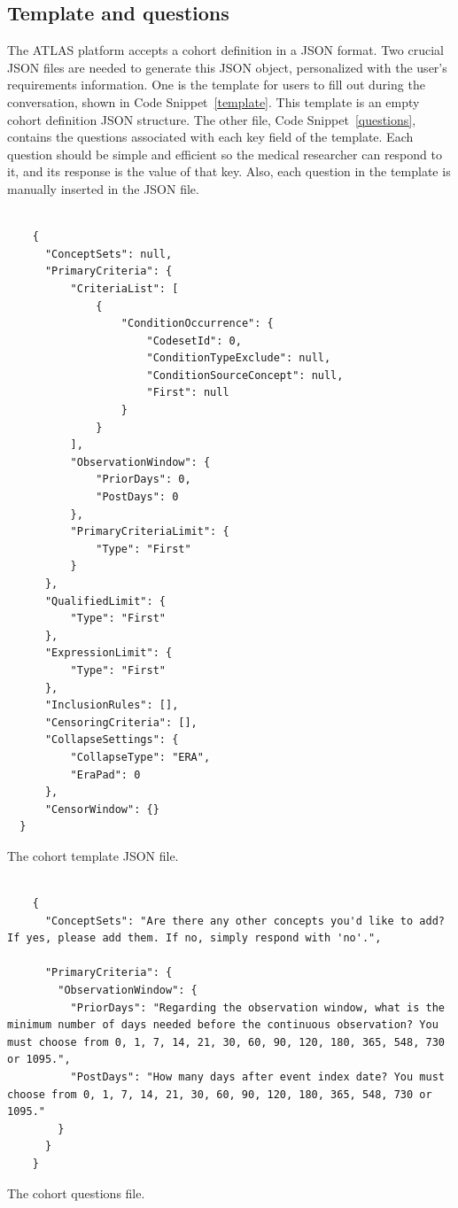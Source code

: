 \subsection{Template and questions}

The ATLAS platform accepts a cohort definition in a JSON format. Two crucial JSON files are needed to generate this JSON object, personalized with the user's requirements information. One is the template for users to fill out during the conversation, shown in Code Snippet~\ref{template}. This template is an empty cohort definition JSON structure. The other file, Code Snippet~\ref{questions}, contains the questions associated with each key field of the template. Each question should be simple and efficient so the medical researcher can respond to it, and its response is the value of that key. Also, each question in the template is manually inserted in the JSON file.  

\begin{listing}[H]
  \begin{verbatim}
      
    {
      "ConceptSets": null,
      "PrimaryCriteria": {
          "CriteriaList": [
              {
                  "ConditionOccurrence": {
                      "CodesetId": 0,
                      "ConditionTypeExclude": null,
                      "ConditionSourceConcept": null,
                      "First": null
                  }
              }
          ],
          "ObservationWindow": {
              "PriorDays": 0,
              "PostDays": 0
          },
          "PrimaryCriteriaLimit": {
              "Type": "First"
          }
      },
      "QualifiedLimit": {
          "Type": "First"
      },
      "ExpressionLimit": {
          "Type": "First"
      },
      "InclusionRules": [],
      "CensoringCriteria": [],
      "CollapseSettings": {
          "CollapseType": "ERA",
          "EraPad": 0
      },
      "CensorWindow": {}
  }

  \end{verbatim}
\caption[The cohort template file]{The cohort template JSON file.}
\label{template}
\end{listing}  

\begin{listing}[H]
  \begin{verbatim}
      
    {
      "ConceptSets": "Are there any other concepts you'd like to add? If yes, please add them. If no, simply respond with 'no'.",
    
      "PrimaryCriteria": {
        "ObservationWindow": {
          "PriorDays": "Regarding the observation window, what is the minimum number of days needed before the continuous observation? You must choose from 0, 1, 7, 14, 21, 30, 60, 90, 120, 180, 365, 548, 730 or 1095.",
          "PostDays": "How many days after event index date? You must choose from 0, 1, 7, 14, 21, 30, 60, 90, 120, 180, 365, 548, 730 or 1095."
        }
      }
    }

  \end{verbatim}
  \caption[The cohort questions file]{The cohort questions file.}
  \label{questions}
\end{listing}


